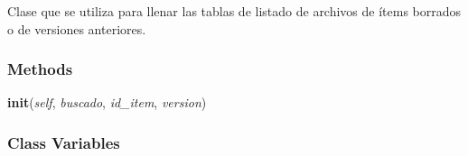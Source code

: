 Clase que se utiliza para llenar las tablas de listado de archivos de ítems
borrados o de versiones anteriores.



  \subsubsection{Methods}

    \label{saip:controllers:archivo_controller_listado:ArchivoTableFiller:init}

    \vspace{0.5ex}

\hspace{.8\funcindent}\begin{boxedminipage}{\funcwidth}

    \raggedright \textbf{init}(\textit{self}, \textit{buscado}, \textit{id\_item}, \textit{version})

\setlength{\parskip}{2ex}
\setlength{\parskip}{1ex}
    \end{boxedminipage}



  \subsubsection{Class Variables}

